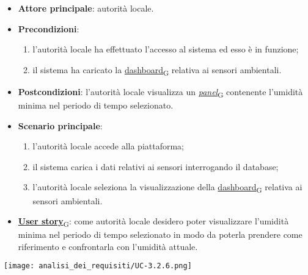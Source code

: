\begin{itemize}
	\item \textbf{Attore principale}: autorità locale.
	\item \textbf{Precondizioni}:
	      \begin{enumerate}
		      \item l'autorità locale ha effettuato l'accesso al sistema ed esso è in funzione;
		      \item il sistema ha caricato la \href{https://7last.github.io/docs/pb/documentazione-interna/glossario\#dashboard}{dashboard\textsubscript{G}} relativa ai sensori ambientali.
	      \end{enumerate}
	\item \textbf{Postcondizioni}: l'autorità locale visualizza un \href{https://7last.github.io/docs/pb/documentazione-interna/glossario\#panel}{\textit{panel}\textsubscript{G}} contenente l'umidità minima nel periodo di tempo selezionato.
	\item \textbf{Scenario principale}:
	      \begin{enumerate}
		      \item l'autorità locale accede alla piattaforma;
		      \item il sistema carica i dati relativi ai sensori interrogando il database;
		      \item l'autorità locale seleziona la visualizzazione della \href{https://7last.github.io/docs/pb/documentazione-interna/glossario\#dashboard}{dashboard\textsubscript{G}} relativa ai sensori ambientali.
	      \end{enumerate}
	\item \href{https://7last.github.io/docs/pb/documentazione-interna/glossario\#user-story}{\textbf{User story}\textsubscript{G}}:
	      come autorità locale desidero poter visualizzare l'umidità minima nel periodo di tempo selezionato
	      in modo da poterla prendere come riferimento e confrontarla con l'umidità attuale.
\end{itemize}
\begin{center}
	\texttt{[image: analisi\_dei\_requisiti/UC-3.2.6.png]}
\end{center}

